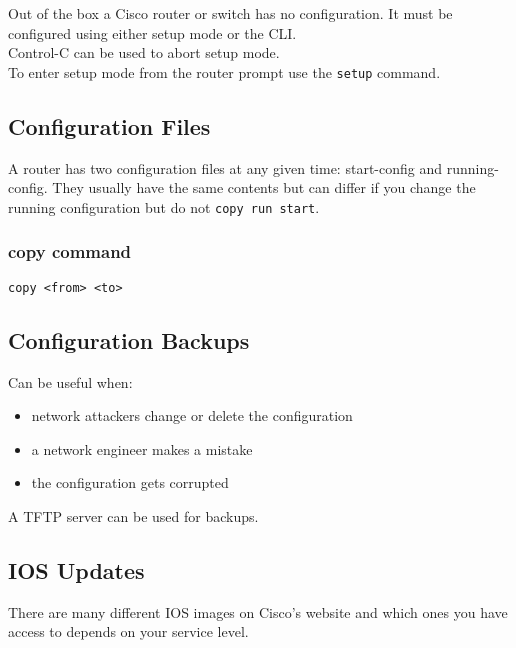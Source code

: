 Out of the box a Cisco router or switch has no configuration. It must
be configured using either setup mode or the CLI.\\

Control-C can be used to abort setup mode.\\

To enter setup mode from the router prompt use the \texttt{setup} command.\\

\subsection{Configuration Files}

A router has two configuration files at any given time: start-config and
running-config. They usually have the same contents but can differ if you
change the running configuration but do not \texttt{copy run start}.\\

\subsubsection{copy command}

\texttt{copy <from> <to>}

\subsection{Configuration Backups}

Can be useful when:

\begin{itemize}

\item network attackers change or delete the configuration
\item a network engineer makes a mistake
\item the configuration gets corrupted

\end{itemize}

A TFTP server can be used for backups.\\

\subsection{IOS Updates}

There are many different IOS images on Cisco's website and which ones you have
access to depends on your service level.\\

